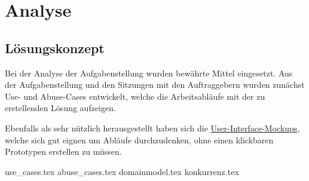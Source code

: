 \chapter{Analyse}
\section{Lösungskonzept}

Bei der Analyse der Aufgabenstellung wurden bewährte Mittel eingesetzt. Aus der Aufgabenstellung und den Sitzungen mit den Auftraggebern wurden zunächst Use- und Abuse-Cases entwickelt, welche die Arbeitsabläufe mit der zu erstellenden Lösung aufzeigen.

Ebenfalls als sehr nützlich herausgestellt haben sich die \hyperref[design:mockups]{User-Interface-Mockups}, welche sich gut eignen um Abläufe durchzudenken, ohne einen klickbaren Prototypen erstellen zu müssen.

\clearpage
{use_cases.tex}
\clearpage
{abuse_cases.tex}
\clearpage
{domainmodel.tex}
\clearpage
{konkurrenz.tex}

